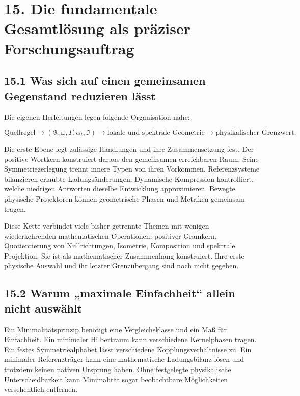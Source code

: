 \section{15. Die fundamentale Gesamtlösung als präziser
Forschungsauftrag}\label{die-fundamentale-gesamtluxf6sung-als-pruxe4ziser-forschungsauftrag}

\subsection{15.1 Was sich auf einen gemeinsamen Gegenstand reduzieren
lässt}\label{was-sich-auf-einen-gemeinsamen-gegenstand-reduzieren-luxe4sst}

Die eigenen Herleitungen legen folgende Organisation nahe:

\[
\boxed{\text{Quellregel}
\longrightarrow (\mathfrak A,\omega,\Gamma,\alpha_t,\mathfrak I)
\longrightarrow\text{lokale und spektrale Geometrie}
\longrightarrow\text{physikalischer Grenzwert}.}
\]

Die erste Ebene legt zulässige Handlungen und ihre Zusammensetzung fest.
Der positive Wortkern konstruiert daraus den gemeinsamen erreichbaren
Raum. Seine Symmetriezerlegung trennt innere Typen von ihren Vorkommen.
Referenzsysteme bilanzieren erlaubte Ladungsänderungen. Dynamische
Kompression kontrolliert, welche niedrigen Antworten dieselbe
Entwicklung approximieren. Bewegte physische Projektoren können
geometrische Phasen und Metriken gemeinsam tragen.

Diese Kette verbindet viele bisher getrennte Themen mit wenigen
wiederkehrenden mathematischen Operationen: positiver Gramkern,
Quotientierung von Nullrichtungen, Isometrie, Komposition und spektrale
Projektion. Sie ist als mathematischer Zusammenhang konstruiert. Ihre
erste physische Auswahl und ihr letzter Grenzübergang sind noch nicht
gegeben.

\subsection{15.2 Warum „maximale Einfachheit`` allein nicht
auswählt}\label{warum-maximale-einfachheit-allein-nicht-auswuxe4hlt}

Ein Minimalitätsprinzip benötigt eine Vergleichsklasse und ein Maß für
Einfachheit. Ein minimaler Hilbertraum kann verschiedene Kernelphasen
tragen. Ein festes Symmetriealphabet lässt verschiedene
Kopplungsverhältnisse zu. Ein minimaler Referenzträger kann eine
mathematische Ladungsbilanz lösen und trotzdem keinen nativen Ursprung
haben. Ohne festgelegte physikalische Unterscheidbarkeit kann
Minimalität sogar beobachtbare Möglichkeiten versehentlich entfernen.

